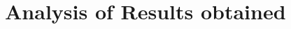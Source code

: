 \documentclass[../main.tex]{subfiles}
\begin{document}
\section{Analysis of Results obtained}
\clearpage
\end{document}
